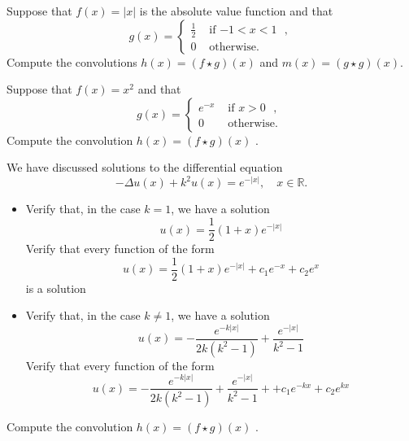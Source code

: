 \documentclass[11pt]{article}
\begin{document}

\begin{exercise}
    Suppose that $f(x) = |x|$ is the absolute value function and that 
    \[
        g(x) = \left\{\begin{array}{cc} \frac 1 2 & \text{ if $-1 < x < 1$ }, \\ 0 & \text{ otherwise. } \end{array}\right.
    \]
    Compute the convolutions $h(x) = (f \star g)(x)$ and $m(x) = (g \star g)(x)$.
\end{exercise}
\begin{solution}     
\end{solution}


\begin{exercise}
    Suppose that $f(x) = x^2$ and that
    \[
        g(x) = \left\{\begin{array}{cc} e^{-x} & \text{ if $x > 0$ }, \\ 0 & \text{ otherwise. } \end{array}\right.
    \]
    Compute the convolution $h(x) = (f \star g)(x)$ .
\end{exercise}

\begin{solution}     
\end{solution}


\begin{exercise}
    We have discussed solutions to the differential equation 
    \[
        - \Delta u(x) + k^2 u(x) = e^{-|x|}, \quad x \in \mathbb R.
    \]
    \begin{itemize}
        \item 
        Verify that, in the case $k=1$, we have a solution 
        \[
            u(x) = \frac 1 2 (1+x) e^{-|x|} 
        \]
        Verify that every function of the form 
        \[
            u(x) = \frac 1 2 (1+x) e^{-|x|} + c_1 e^{-x} + c_2 e^{x} 
        \]
        is a solution 
        \item 
        Verify that, in the case $k \neq 1$, we have a solution 
        \[
            u(x) = - \frac{ e^{-k|x|} }{ 2k (k^2-1) } + \frac{ e^{-|x|} }{ k^2-1 }
        \]
        Verify that every function of the form 
        \[
            u(x) = - \frac{ e^{-k|x|} }{ 2k (k^2-1) } + \frac{ e^{-|x|} }{ k^2-1 } +  + c_1 e^{-kx} + c_2 e^{kx} 
        \]        
    \end{itemize}
    Compute the convolution $h(x) = (f \star g)(x)$ .
\end{exercise}

\begin{solution}     
\end{solution}

\begin{exercise}
\end{exercise}
\begin{solution}     
\end{solution}

\begin{exercise}
\end{exercise}
\begin{solution}     
\end{solution}
\end{document}
